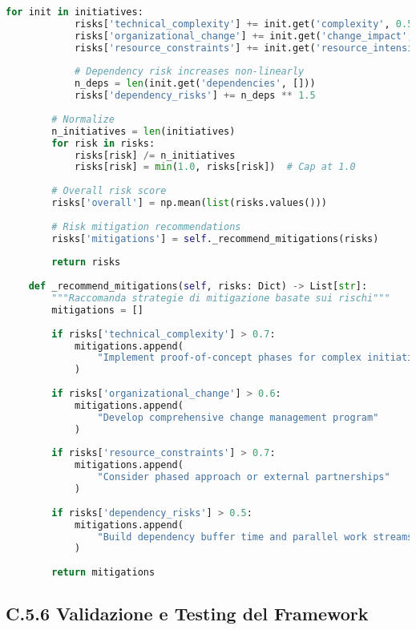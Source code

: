\begin{lstlisting}[language=Python, caption=Generazione Roadmap Ottimizzata GIST]
        for init in initiatives:
            risks['technical_complexity'] += init.get('complexity', 0.5)
            risks['organizational_change'] += init.get('change_impact', 0.5)
            risks['resource_constraints'] += init.get('resource_intensity', 0.5)
            
            # Dependency risk increases non-linearly
            n_deps = len(init.get('dependencies', []))
            risks['dependency_risks'] += n_deps ** 1.5
        
        # Normalize
        n_initiatives = len(initiatives)
        for risk in risks:
            risks[risk] /= n_initiatives
            risks[risk] = min(1.0, risks[risk])  # Cap at 1.0
        
        # Overall risk score
        risks['overall'] = np.mean(list(risks.values()))
        
        # Risk mitigation recommendations
        risks['mitigations'] = self._recommend_mitigations(risks)
        
        return risks
    
    def _recommend_mitigations(self, risks: Dict) -> List[str]:
        """Raccomanda strategie di mitigazione basate sui rischi"""
        mitigations = []
        
        if risks['technical_complexity'] > 0.7:
            mitigations.append(
                "Implement proof-of-concept phases for complex initiatives"
            )
            
        if risks['organizational_change'] > 0.6:
            mitigations.append(
                "Develop comprehensive change management program"
            )
            
        if risks['resource_constraints'] > 0.7:
            mitigations.append(
                "Consider phased approach or external partnerships"
            )
            
        if risks['dependency_risks'] > 0.5:
            mitigations.append(
                "Build dependency buffer time and parallel work streams"
            )
        
        return mitigations
\end{lstlisting}

\subsection{C.5.6 Validazione e Testing del Framework}

